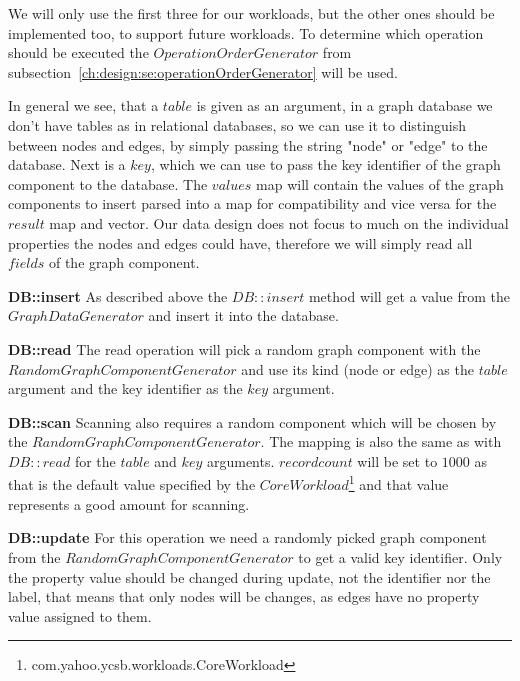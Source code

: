We will only use the first three for our workloads,
but the other ones should be implemented too,
to support future workloads.
To determine which operation should be executed the $ OperationOrderGenerator $ from subsection~\ref{ch:design:se:operationOrderGenerator} will be used.

In general we see,
that a $ table $ is given as an argument,
in a graph database we don't have tables as in relational databases,
so we can use it to distinguish between nodes and edges,
by simply passing the string "node" or "edge" to the database.
Next is a $ key $,
which we can use to pass the key identifier of the graph component to the database.
The $ values $ map will contain the values of the graph components to insert parsed into a map for compatibility and vice versa for the $ result $ map and vector.
Our data design does not focus to much on the individual properties the nodes and edges could have,
therefore we will simply read all $ fields $ of the graph component.

\textbf{DB::insert} \newline
As described above the $ DB::insert $ method will get a value from the \linebreak
$ GraphDataGenerator $ and insert it into the database.

\textbf{DB::read} \newline
The read operation will pick a random graph component with the \linebreak
$ RandomGraphComponentGenerator $ and use its kind (node or edge) as the $ table $ argument and the key identifier as the $ key $ argument.

\textbf{DB::scan} \newline
Scanning also requires a random component which will be chosen by the \linebreak
$ RandomGraphComponentGenerator $.
The mapping is also the same as with $ DB::read $ for the $ table $ and $ key $ arguments.
$ recordcount $ will be set to $ 1000 $ as that is the default value specified by the $ CoreWorkload $\footnote{com.yahoo.ycsb.workloads.CoreWorkload} and that value represents a good amount for scanning.

\textbf{DB::update} \newline
For this operation we need a randomly picked graph component from the \linebreak
$ RandomGraphComponentGenerator $ to get a valid key identifier.
Only the property value should be changed during update,
not the identifier nor the label,
that means that only nodes will be changes,
as edges have no property value assigned to them.

